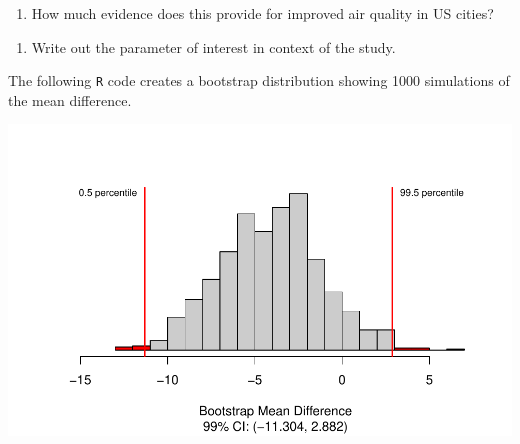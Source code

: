 \documentclass[
]{report}
\newenvironment{Shaded}{\begin{snugshade}}{\end{snugshade}}
\newcommand{\CommentTok}[1]{\textcolor[rgb]{0.56,0.35,0.01}{\textit{#1}}}
\newcommand{\DataTypeTok}[1]{\textcolor[rgb]{0.13,0.29,0.53}{#1}}
\newcommand{\DecValTok}[1]{\textcolor[rgb]{0.00,0.00,0.81}{#1}}
\newcommand{\FloatTok}[1]{\textcolor[rgb]{0.00,0.00,0.81}{#1}}
\newcommand{\KeywordTok}[1]{\textcolor[rgb]{0.13,0.29,0.53}{\textbf{#1}}}
\newcommand{\NormalTok}[1]{#1}
\newcommand{\OperatorTok}[1]{\textcolor[rgb]{0.81,0.36,0.00}{\textbf{#1}}}
\providecommand{\tightlist}{%
  \setlength{\itemsep}{0pt}\setlength{\parskip}{0pt}}
\begin{document}
\vspace{.8in}

\begin{enumerate}
\def\labelenumi{\arabic{enumi}.}
\setcounter{enumi}{16}
\tightlist
\item
  How much evidence does this provide for improved air quality in US cities?
\end{enumerate}

\vspace{.3in}

\begin{enumerate}
\def\labelenumi{\arabic{enumi}.}
\setcounter{enumi}{17}
\tightlist
\item
  Write out the parameter of interest in context of the study.
\end{enumerate}

\vspace{.6in}

The following \texttt{R} code creates a bootstrap distribution showing 1000 simulations of the mean difference.

\begin{Shaded}
\end{Shaded}

\begin{center}\includegraphics[width=0.7\linewidth]{08-paired_files/figure-latex/unnamed-chunk-6-1} \end{center}
\end{document}
